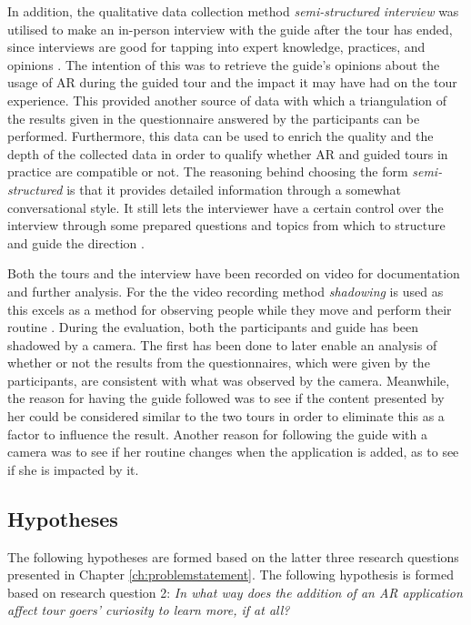 In addition, the qualitative data collection method \textit{semi-structured interview} was utilised to make an in-person interview with the guide after the tour has ended, since interviews are good for tapping into expert knowledge, practices, and opinions \cite{RAND}. The intention of this was to retrieve the guide’s opinions about the usage of AR during the guided tour and the impact it may have had on the tour experience. This provided another source of data with which a triangulation of the results given in the questionnaire answered by the participants can be performed. Furthermore, this data can be used to enrich the quality and the depth of the collected data in order to qualify whether AR and guided tours in practice are compatible or not. The reasoning behind choosing the form \textit{semi-structured} is that it provides detailed information through a somewhat conversational style. It still lets the interviewer have a certain control over the interview through some prepared questions and topics from which to structure and guide the direction \cite{RAND}.

Both the tours and the interview have been recorded on video for documentation and further analysis. For the the video recording method \textit{shadowing} is used as this excels as a method for observing people while they move and perform their routine \cite{Ylirisku2007}. During the evaluation, both the participants and guide has been shadowed by a camera. The first has been done to later enable an analysis of whether or not the results from the questionnaires, which were given by the participants, are consistent with what was observed by the camera. Meanwhile, the reason for having the guide followed was to see if the content presented by her could be considered similar to the two tours in order to eliminate this as a factor to influence the result. Another reason for following the guide with a camera was to see if her routine changes when the application is added, as to see if she is impacted by it.

\subsection{Hypotheses}\label{sec:hypotheses}
The following hypotheses are formed based on the latter three research questions presented in Chapter \ref{ch:problemstatement}. The following hypothesis is formed based on research question 2: \textit{In what way does the addition of an AR application affect tour goers’ curiosity to learn more, if at all?}

